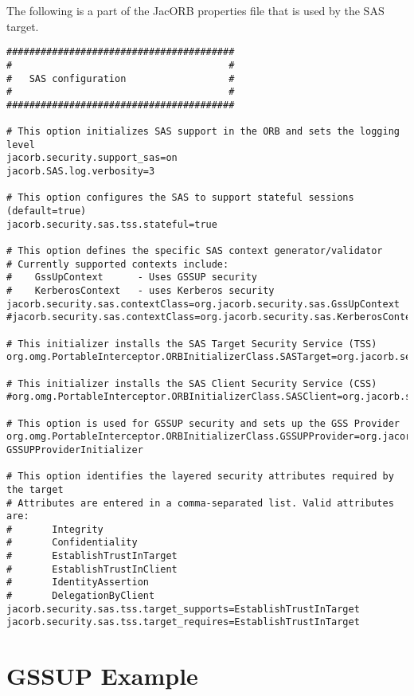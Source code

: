 The following is a part of the JacORB properties file that is used by 
the SAS target.

\begin{scriptsize}
\begin{verbatim}
########################################
#                                      #
#   SAS configuration                  #
#                                      #
########################################

# This option initializes SAS support in the ORB and sets the logging level
jacorb.security.support_sas=on
jacorb.SAS.log.verbosity=3

# This option configures the SAS to support stateful sessions (default=true)
jacorb.security.sas.tss.stateful=true

# This option defines the specific SAS context generator/validator
# Currently supported contexts include:
#    GssUpContext      - Uses GSSUP security
#    KerberosContext   - uses Kerberos security
jacorb.security.sas.contextClass=org.jacorb.security.sas.GssUpContext
#jacorb.security.sas.contextClass=org.jacorb.security.sas.KerberosContext

# This initializer installs the SAS Target Security Service (TSS)
org.omg.PortableInterceptor.ORBInitializerClass.SASTarget=org.jacorb.security.sas.SASTargetInitializer

# This initializer installs the SAS Client Security Service (CSS)
#org.omg.PortableInterceptor.ORBInitializerClass.SASClient=org.jacorb.security.sas.SASClientInitializer

# This option is used for GSSUP security and sets up the GSS Provider
org.omg.PortableInterceptor.ORBInitializerClass.GSSUPProvider=org.jacorb.security.sas.
GSSUPProviderInitializer

# This option identifies the layered security attributes required by the target
# Attributes are entered in a comma-separated list. Valid attributes are:
#       Integrity
#       Confidentiality
#       EstablishTrustInTarget
#       EstablishTrustInClient
#       IdentityAssertion
#       DelegationByClient
jacorb.security.sas.tss.target_supports=EstablishTrustInTarget
jacorb.security.sas.tss.target_requires=EstablishTrustInTarget
\end{verbatim}
\end{scriptsize}

\section{GSSUP Example}

